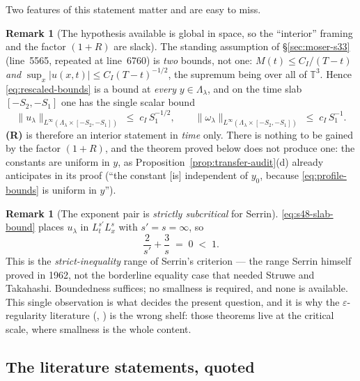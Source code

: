 \documentclass[11pt]{article}
\theoremstyle{definition}
\newtheorem{remark}[theorem]{Remark}
\theoremstyle{remark}
\newcommand{\T}{\mathbb{T}}
\begin{document}
Two features of this statement matter and are easy to miss.

\begin{remark}[The hypothesis available is global in space, so the
  ``interior'' framing and the factor $(1+R)$ are slack]
  \label{rem:s48-global-in-space}
  The standing assumption of \S\ref{sec:moser-s33} (line~5565, repeated at
  line~6760) is \emph{two} bounds, not one:
  $M(t)\leq C_I/(T-t)$ \emph{and} $\sup_{x}|u(x,t)|\leq C_I(T-t)^{-1/2}$, the
  supremum being over all of $\T^3$. Hence \eqref{eq:rescaled-bounds} is a
  bound at \emph{every} $y\in\Lambda_\lambda$, and on the time slab
  $[-S_2,-S_1]$ one has the single scalar bound
  \begin{equation}\label{eq:s48-slab-bound}
    \bigl\|u_\lambda\bigr\|_{L^\infty(\Lambda_\lambda\times[-S_2,-S_1])}
    \;\leq\; c_I\,S_1^{-1/2},
    \qquad
    \bigl\|\omega_\lambda\bigr\|_{L^\infty(\Lambda_\lambda\times[-S_2,-S_1])}
    \;\leq\; c_I\,S_1^{-1} .
  \end{equation}
  \textbf{(R)} is therefore an interior statement in \emph{time} only. There
  is nothing to be gained by the factor $(1+R)$, and the theorem proved below
  does not produce one: the constants are uniform in $y$, as
  Proposition~\ref{prop:transfer-audit}(d) already anticipates in its proof
  (``the constant [is] independent of $y_0$, because
  \eqref{eq:profile-bounds} is uniform in $y$'').
\end{remark}

\begin{remark}[The exponent pair is \emph{strictly subcritical} for Serrin]
  \label{rem:s48-subcritical}
  \eqref{eq:s48-slab-bound} places $u_\lambda$ in $L^{s'}_tL^s_x$ with
  $s'=s=\infty$, so
  \[
    \frac{2}{s'}+\frac{3}{s} \;=\; 0 \;<\; 1 .
  \]
  This is the \emph{strict-inequality} range of Serrin's criterion --- the
  range Serrin himself proved in 1962, not the borderline equality case that
  needed Struwe and Takahashi. Boundedness suffices; no smallness is required,
  and none is available. This single observation is what decides the present
  question, and it is why the $\varepsilon$-regularity literature
  (\cite{CKN1982}, \cite{LadyzhenskayaSeregin1999}) is the wrong shelf: those
  theorems live at the critical scale, where smallness is the whole content.
\end{remark}

\subsection{The literature statements, quoted}
\label{subsec:s48-literature}
\end{document}
